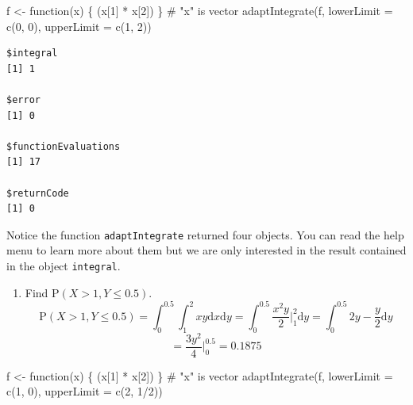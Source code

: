 \documentclass[
  letterpaper,
  DIV=11,
  numbers=noendperiod]{scrreprt}
\newenvironment{Shaded}{\begin{snugshade}}{\end{snugshade}}
\newcommand{\AttributeTok}[1]{\textcolor[rgb]{0.40,0.45,0.13}{#1}}
\newcommand{\CommentTok}[1]{\textcolor[rgb]{0.37,0.37,0.37}{#1}}
\newcommand{\ControlFlowTok}[1]{\textcolor[rgb]{0.00,0.23,0.31}{#1}}
\newcommand{\DecValTok}[1]{\textcolor[rgb]{0.68,0.00,0.00}{#1}}
\newcommand{\FunctionTok}[1]{\textcolor[rgb]{0.28,0.35,0.67}{#1}}
\newcommand{\NormalTok}[1]{\textcolor[rgb]{0.00,0.23,0.31}{#1}}
\newcommand{\OtherTok}[1]{\textcolor[rgb]{0.00,0.23,0.31}{#1}}
\newcommand{\SpecialCharTok}[1]{\textcolor[rgb]{0.37,0.37,0.37}{#1}}
\providecommand{\tightlist}{%
  \setlength{\itemsep}{0pt}\setlength{\parskip}{0pt}}\usepackage{longtable,booktabs,array}
\begin{document}
\begin{Shaded}
\begin{Highlighting}[]
\NormalTok{f }\OtherTok{\textless{}{-}} \ControlFlowTok{function}\NormalTok{(x) \{ (x[}\DecValTok{1}\NormalTok{] }\SpecialCharTok{*}\NormalTok{ x[}\DecValTok{2}\NormalTok{]) \} }\CommentTok{\# "x" is vector}
\FunctionTok{adaptIntegrate}\NormalTok{(f, }\AttributeTok{lowerLimit =} \FunctionTok{c}\NormalTok{(}\DecValTok{0}\NormalTok{, }\DecValTok{0}\NormalTok{), }\AttributeTok{upperLimit =} \FunctionTok{c}\NormalTok{(}\DecValTok{1}\NormalTok{, }\DecValTok{2}\NormalTok{))}
\end{Highlighting}
\end{Shaded}

\begin{verbatim}
$integral
[1] 1

$error
[1] 0

$functionEvaluations
[1] 17

$returnCode
[1] 0
\end{verbatim}

Notice the function \texttt{adaptIntegrate} returned four objects. You
can read the help menu to learn more about them but we are only
interested in the result contained in the object \texttt{integral}.

\begin{enumerate}
\def\labelenumi{\alph{enumi})}
\setcounter{enumi}{1}
\tightlist
\item
  Find \(\mbox{P}(X > 1, Y \leq 0.5)\). \[
  \mbox{P}(X>1,Y\leq 0.5)=\int_0^{0.5}\int_1^2 xy \mbox{d}x \mbox{d}y = \int_0^{0.5} \frac{x^2 y}{2}\bigg|_1^2 \mbox{d}y = \int_0^{0.5}2y - \frac{y}{2}\mbox{d}y 
  \] \[
  = \frac{3y^2}{4}\bigg|_0^{0.5}=0.1875
  \]
\end{enumerate}

\begin{Shaded}
\begin{Highlighting}[]
\NormalTok{f }\OtherTok{\textless{}{-}} \ControlFlowTok{function}\NormalTok{(x) \{ (x[}\DecValTok{1}\NormalTok{] }\SpecialCharTok{*}\NormalTok{ x[}\DecValTok{2}\NormalTok{]) \} }\CommentTok{\# "x" is vector}
\FunctionTok{adaptIntegrate}\NormalTok{(f, }\AttributeTok{lowerLimit =} \FunctionTok{c}\NormalTok{(}\DecValTok{1}\NormalTok{, }\DecValTok{0}\NormalTok{), }\AttributeTok{upperLimit =} \FunctionTok{c}\NormalTok{(}\DecValTok{2}\NormalTok{, }\DecValTok{1}\SpecialCharTok{/}\DecValTok{2}\NormalTok{))}
\end{Highlighting}
\end{Shaded}
\end{document}
